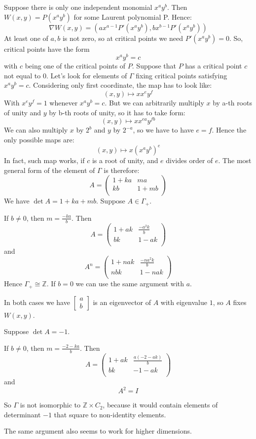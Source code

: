 \documentclass[a4paper]{article}
\begin{document}
Suppose there is only one independent monomial $x^a y^b$. Then
$W(x, y) = P(x^a y^b)$ for some Laurent polynomial P.
Hence:
$$\nabla W(x,y) = (a x^{a-1} P'(x^a y^b), b x^{b-1} P'(x^a y^b))$$
At least one of $a, b$ is not zero, so at critical points we need $P'(x^a y^b) = 0$.
So, critical points have the form $$x^a y^b = c$$ with $c$ being one of the critical points of $P$.
Suppose that $P$ has a critical point $c$ not equal to $0$.
Let's look for elements of $\Gamma$ fixing critical points satisfying $x^a y^b =c$. Considering only first coordinate, the map has to look like:
$$(x,y) \mapsto x x^e y^f$$
With $x^e y^f=1$ whenever $x^a y^b = c$.
But we can arbitrarily multiply $x$ by a-th roots of unity and $y$ by b-th roots of unity, so it has to take form:
$$(x,y) \mapsto x x^{e a} y^{f b}$$
We can also multiply $x$ by $2^b$ and $y$ by $2^{-a}$, so we have to have $e=f$. Hence the only possible maps are:
$$(x,y) \mapsto x (x^{a} y^{b})^e$$
In fact, such map works, if $c$ is a root of unity, and $e$ divides order of $e$.
The most general form of the element of $\Gamma$ is therefore:
$$A = \begin{pmatrix}
	1+ k a & m a \\ 
	k b & 1+m b \\
\end{pmatrix}$$
We have $\det A = 1 + k a + m b$.
Suppose $A \in \Gamma_+$.

If $b \neq 0$, then $m = \frac{-k a}{b}$.
Then 
$$A = \begin{pmatrix}
1 + a k & \frac{- a^2 k}{b} \\ 
b k & 1 - a k \\
\end{pmatrix} $$
and 
$$A^n = \begin{pmatrix}
1 + n a k & \frac{- n a^2 k}{b} \\ 
n b k & 1 - n a k \\
\end{pmatrix} $$
Hence $\Gamma_+ \cong \mathbb{Z}$.
If $b = 0$ we can use the same argument with $a$.

In both cases we have $ \begin{bmatrix}
a\\ 
b 
\end{bmatrix}$ is an eigenvector of $A$ with eigenvalue $1$, so $A$ fixes $W(x,y)$.

Suppose $\det A  = -1$.

If $b \neq 0$, then $m = \frac{-2-k a}{b}$.
Then 
$$A = \begin{pmatrix}
1 + a k & \frac{a(-2-a k)}{b} \\ 
b k & -1 - a k \\
\end{pmatrix} $$
and 
$$A^2 = I $$

So $\Gamma$ is not isomorphic to $\mathbb{Z} \times C_2$, because it would contain elements of determinant $-1$ that square to non-identity elements.

The same argument also seems to work for higher dimensions.
\end{document}
